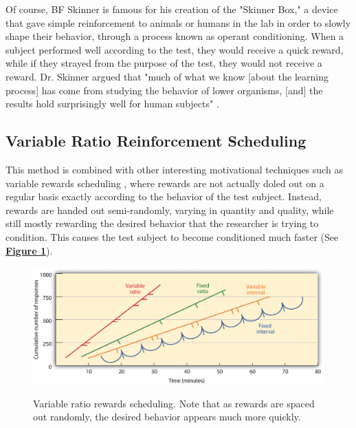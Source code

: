 
\par 

Of course, BF Skinner is famous for his creation of the "Skinner Box," \cite{skinner1963operant} a device that gave simple reinforcement to animals or humans in the lab in order to slowly shape their behavior, through a process known as operant conditioning. When a subject performed well according to the test, they would receive a quick reward, while if they strayed from the purpose of the test, they would not receive a reward. Dr. Skinner argued that "much of what we know [about the learning process] has come from studying the behavior of lower organisms, [and] the results hold surprisingly well for human subjects" \cite{skinner1958teaching}.

\subsection{Variable Ratio Reinforcement Scheduling}
 This method is combined with other interesting motivational techniques such as variable rewards scheduling \cite{ferster1957schedules} \cite{hardy_heyes_1999}, where rewards are not actually doled out on a regular basis exactly according to the behavior of the test subject. Instead, rewards are handed out semi-randomly, varying in quantity and quality, while still mostly rewarding the desired behavior that the researcher is trying to condition. This causes the test subject to become conditioned much faster (See \textbf{\hyperref[fig:variable_ratio]{Figure \ref*{fig:variable_ratio}}}).
 
 \begin{figure}[h]
 	\includegraphics[width=1.0\linewidth]{figures/variable_ratio}
 	\caption{Variable ratio rewards scheduling. Note that as rewards are spaced out randomly, the desired behavior appears much more quickly.}
 	\label{fig:variable_ratio}
 	\cite{hardy_heyes_1999}
 \end{figure}

